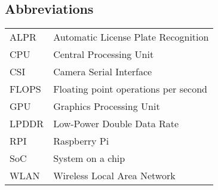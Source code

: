 \subsection{Abbreviations}
\begin{tabularx}{\textwidth}{lX}
    ALPR  & Automatic License Plate Recognition\\
    CPU   & Central Processing Unit\\
    CSI   & Camera Serial Interface\\
    FLOPS & Floating point operations per second\\
    GPU   & Graphics Processing Unit\\
    LPDDR & Low-Power Double Data Rate\\
    RPI   & Raspberry Pi\\
    SoC   & System on a chip\\
    WLAN  & Wireless Local Area Network\\
\end{tabularx}
